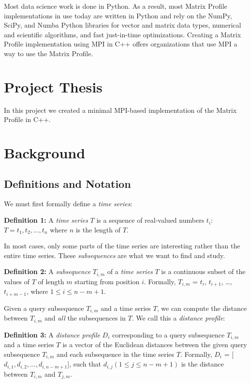 \documentclass[conference]{IEEEtran}
\begin{document}
Most data science work is done in Python.  As a result, most Matrix Profile implementations in use today are written in Python\cite{Stumpy} and rely on the NumPy, SciPy, and Numba Python libraries for vector and matrix data types, numerical and scientific algorithms, and fast just-in-time optimizations.  Creating a Matrix Profile implementation using MPI in C++ offers organizations that use MPI a way to use the Matrix Profile. 

\section{Project Thesis}
In this project we created a minimal MPI-based implementation of the Matrix Profile in C++.

\section{Background}
\subsection{Definitions and Notation}

We must first formally define a \emph{time series}:

\textbf{Definition 1:} A \emph{time series} $T$ is a sequence of real-valued numbers $t_i$: $T = t_1, t_2, \ldots{}, t_n$ where $n$ is the length of $T$.

In most cases, only some parts of the time series are interesting rather than the entire time series.  These \emph{subsequences} are what we want to find and study.

\textbf{Definition 2:} A \emph{subsequence} $T_{i,m}$ of a \emph{time series} $T$ is a continuous subset of the values of $T$ of length $m$ starting from position $i$.  Formally, $T_{i,m}$ = $t_i$, $t_{i+1}$, \ldots{}, $t_{i+m-1}$, where $1 \leq i \leq n-m+1$.

Given a query subsequence $T_{i,m}$ and a time series $T$, we can compute the distance between $T_{i,m}$ and \emph{all} the subsequences in $T$.  We call this a \emph{distance profile}:

\textbf{Definition 3:} A \emph{distance profile} $D_i$ corresponding to a query subsequence $T_{i,m}$ and a time series $T$ is a vector of the Euclidean distances between the given query subsequence $T_{i,m}$ and each subsequence in the time series $T$.  Formally, $D_i$ = [$d_{i,1}, d_{i,2}, \ldots{}, d_{i,n-m+1}$], such that $d_{i,j}(1 \leq j \leq n-m+1)$ is the distance between $T_{i,m}$ and $T_{j,m}$.
\end{document}
